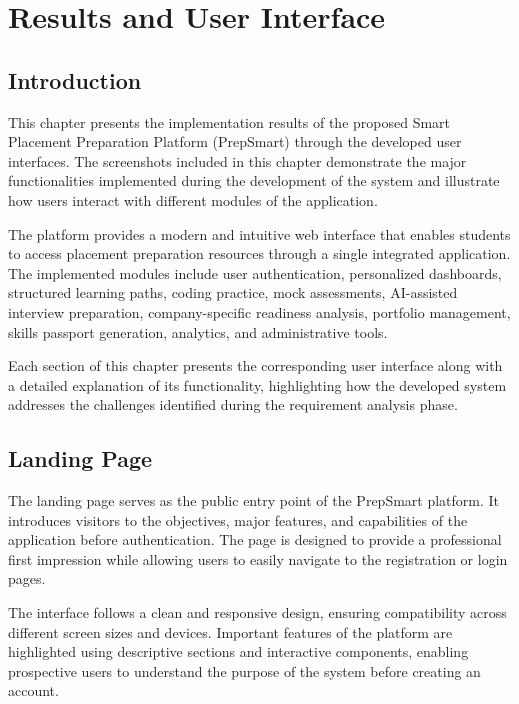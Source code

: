 \chapter{Results and User Interface}

\section{Introduction}

This chapter presents the implementation results of the proposed Smart Placement Preparation Platform (PrepSmart) through the developed user interfaces. The screenshots included in this chapter demonstrate the major functionalities implemented during the development of the system and illustrate how users interact with different modules of the application.

The platform provides a modern and intuitive web interface that enables students to access placement preparation resources through a single integrated application. The implemented modules include user authentication, personalized dashboards, structured learning paths, coding practice, mock assessments, AI-assisted interview preparation, company-specific readiness analysis, portfolio management, skills passport generation, analytics, and administrative tools.

Each section of this chapter presents the corresponding user interface along with a detailed explanation of its functionality, highlighting how the developed system addresses the challenges identified during the requirement analysis phase.

\section{Landing Page}

The landing page serves as the public entry point of the PrepSmart platform. It introduces visitors to the objectives, major features, and capabilities of the application before authentication. The page is designed to provide a professional first impression while allowing users to easily navigate to the registration or login pages.

The interface follows a clean and responsive design, ensuring compatibility across different screen sizes and devices. Important features of the platform are highlighted using descriptive sections and interactive components, enabling prospective users to understand the purpose of the system before creating an account.

